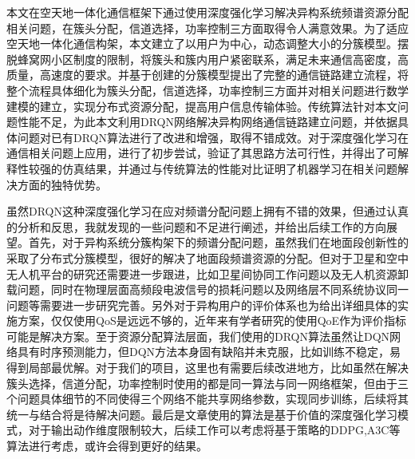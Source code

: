 \begin{conclusions}

本文在空天地一体化通信框架下通过使用深度强化学习解决异构系统频谱资源分配相关问题，在簇头分配，信道选择，功率控制三方面取得令人满意效果。为了适应空天地一体化通信构架，本文建立了以用户为中心，动态调整大小的分簇模型。摆脱蜂窝网小区制度的限制，将簇头和簇内用户紧密联系，满足未来通信高密度，高质量，高速度的要求。并基于创建的分簇模型提出了完整的通信链路建立流程，将整个流程具体细化为簇头分配，信道选择，功率控制三方面并对相关问题进行数学建模的建立，实现分布式资源分配，提高用户信息传输体验。传统算法针对本文问题性能不足，为此本文利用DRQN网络解决异构网络通信链路建立问题，并依据具体问题对已有DRQN算法进行了改进和增强，取得不错成效。对于深度强化学习在通信相关问题上应用，进行了初步尝试，验证了其思路方法可行性，并得出了可解释性较强的仿真结果，并通过与传统算法的性能对比证明了机器学习在相关问题解决方面的独特优势。

虽然DRQN这种深度强化学习在应对频谱分配问题上拥有不错的效果，但通过认真的分析和反思，我就发现的一些问题和不足进行阐述，并给出后续工作的方向展望。首先，对于异构系统分簇构架下的频谱分配问题，虽然我们在地面段创新性的采取了分布式分簇模型，很好的解决了地面段频谱资源的分配。但对于卫星和空中无人机平台的研究还需要进一步跟进，比如卫星间协同工作问题以及无人机资源卸载问题，同时在物理层面高频段电波信号的损耗问题以及网络层不同系统协议同一问题等需要进一步研究完善。另外对于异构用户的评价体系也为给出详细具体的实施方案，仅仅使用QoS是远远不够的，近年来有学者研究的使用QoE作为评价指标可能是解决方案。至于资源分配算法层面，我们使用的DRQN算法虽然让DQN网络具有时序预测能力，但DQN方法本身固有缺陷并未克服，比如训练不稳定，易得到局部最优解。对于我们的项目，这里也有需要后续改进地方，比如虽然在解决簇头选择，信道分配，功率控制时使用的都是同一算法与同一网络框架，但由于三个问题具体细节的不同使得三个网络不能共享网络参数，实现同步训练，后续将其统一与结合将是待解决问题。最后是文章使用的算法是基于价值的深度强化学习模式，对于输出动作维度限制较大，后续工作可以考虑将基于策略的DDPG,A3C等算法进行考虑，或许会得到更好的结果。

\end{conclusions}
